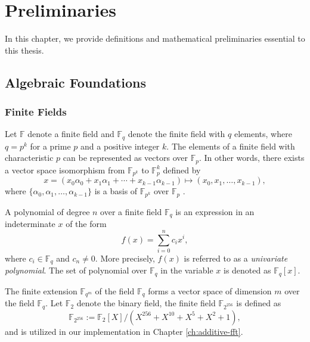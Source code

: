 \chapter{Preliminaries}
In this chapter, we provide definitions and mathematical preliminaries essential to this thesis.

\section{Algebraic Foundations}

\subsection{Finite Fields}
Let $\mathbb{F}$ denote a finite field and $\mathbb{F}_q$ denote the finite field with $q$ elements, where $q=p^k$ for a prime $p$ and a positive integer $k$. The elements of a finite field with characteristic $p$ can be represented as vectors over $\mathbb{F}_p$. In other words, there exists a vector space isomorphism from $\mathbb{F}_{p^k}$ to $\mathbb{F}_p^k$ defined by $$x=(x_0\alpha_0+x_1\alpha_1+ \cdots +x_{k-1}\alpha_{k-1}) \mapsto (x_0,x_1, \ldots,x_{k-1}),$$ where $\{\alpha_{0},\alpha_{1},\ldots,\alpha_{k-1}\}$ is a basis of $\mathbb{F}_{p^k}$ over $\mathbb{F}_p$ \cite{samanta2023thesis}.

A polynomial of degree $n$ over a finite field $\mathbb{F}_{q}$ is an expression in an indeterminate $x$ of the form
\[
f(x) = \sum_{i=0}^{n} c_i x^i,
\]
where $c_i \in \mathbb{F}_{q}$ and $c_n \neq 0$. More precisely, $f(x)$ is referred to as a \textit{univariate polynomial}. The set of polynomial over $\mathbb{F}_{q}$ in the variable $x$ is denoted as $\mathbb{F}_{q}[x]$. 

The finite extension $\mathbb{F}_{q^m}$ of the field $\mathbb{F}_{q}$ forms a vector space of dimension $m$ over the field $\mathbb{F}_{q}$. Let $\mathbb{F}_2$ denote the binary field, the  finite field $\mathbb{F}_{2^{256}}$ is defined as
\begin{equation}\label{eq:F_2_256}
	\mathbb{F}_{2^{256}} := \mathbb{F}_{2}[X]/(X^{256} + X^{10} + X^5 + X^2 + 1),
\end{equation}
and is utilized in our implementation in Chapter \ref{ch:additive-fft}.

